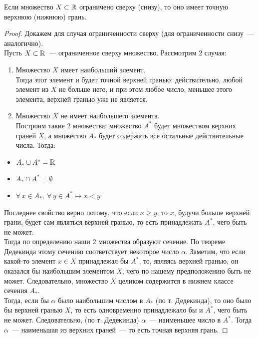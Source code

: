 \begin{theorem} \label{theorem_set_SupInf}
Если множество \(X\subset\mathbb{R}\) ограничено сверху (снизу),
то оно имеет точную верхнюю (нижнюю) грань.

\begin{proof}
Докажем для случая ограниченности сверху (для ограниченности снизу~--- аналогично). \\
Пусть \(X\subset\mathbb{R}\)~--- ограниченное сверху множество. Рассмотрим 2 случая: \\

\begin{enumerate}
\item Множество \(X\) имеет наибольший элемент. \\
Тогда этот элемент и будет точной верхней гранью: действительно,
любой элемент из \(X\) не больше него, и при этом любое число,
меньшее этого элемента, верхней гранью уже не является.\\

\item Множество \(X\) не имеет наибольшего элемента.\\
Построим такие 2 множества: множество \(A^{*}\) будет множеством верхних граней \(X\),
а множество \(A_{*}\) будет содержать все остальные действительные числа. Тогда:
\end{enumerate}

\begin{itemize}
\item \(A_{*} \cup A^{*} = \mathbb{R}\)
\item \(A_{*} \cap A^{*} = \emptyset\)
\item \(\forall\,x\in A_{*},~\forall\,y\in A^{*} \longmapsto x < y\)
\end{itemize}

Последнее свойство верно потому, что если \(x\geq y\), то \(x\),
будучи больше верхней грани, будет сам являться верхней гранью,
то есть принадлежать \(A^{*}\), чего быть не может.\\

Тогда по определению наши 2 множества образуют сечение.
По теореме Дедекинда этому сечению соответствует некоторое число \(\alpha\).
Заметим, что если какой-то элемент \({x\in X}\) принадлежал бы \(A^{*}\),
то, являясь верхней гранью, он оказался бы наибольшим элементом \(X\),
чего по нашему предположению быть не может.
Следовательно, множество \(X\) целиком содержится в нижнем классе сечения \(A_{*}\).\\

Тогда, если бы \(\alpha\) было наибольшим числом в \(A_{*}\) (по т. Дедекинда),
то оно было бы верхней гранью \(X\), то есть одновременно принадлежало бы и \(A^{*}\),
чего быть не может.
Следовательно, (по т. Дедекинда) \(\alpha\)~--- наименьшее число в \(A^{*}\).
Тогда \(\alpha\)~--- наименьшая из верхних граней~--- то есть точная верхняя грань.
\end{proof}
\end{theorem}

